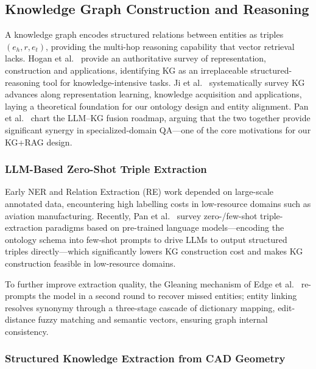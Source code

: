 \documentclass[applsci,article,submit,pdftex,moreauthors]{Definitions/mdpi}
\begin{document}
\subsection{Knowledge Graph Construction and Reasoning}
\label{sec:related-kg}

A knowledge graph encodes structured relations between entities as triples $(e_h, r, e_t)$, providing the multi-hop reasoning capability that vector retrieval lacks. Hogan et al.~\citep{hogan2021kg} provide an authoritative survey of representation, construction and applications, identifying KG as an irreplaceable structured-reasoning tool for knowledge-intensive tasks. Ji et al.~\citep{ji2022kgsurvey} systematically survey KG advances along representation learning, knowledge acquisition and applications, laying a theoretical foundation for our ontology design and entity alignment. Pan et al.~\citep{pan2024kgllmsurvey} chart the LLM--KG fusion roadmap, arguing that the two together provide significant synergy in specialized-domain QA---one of the core motivations for our KG+RAG design.

\subsubsection{LLM-Based Zero-Shot Triple Extraction}

Early NER and Relation Extraction (RE) work depended on large-scale annotated data, encountering high labelling costs in low-resource domains such as aviation manufacturing. Recently, Pan et al.~\citep{pan2024kgllmsurvey} survey zero-/few-shot triple-extraction paradigms based on pre-trained language models---encoding the ontology schema into few-shot prompts to drive LLMs to output structured triples directly---which significantly lowers KG construction cost and makes KG construction feasible in low-resource domains.

To further improve extraction quality, the Gleaning mechanism of Edge et al.~\citep{edge2024graphrag} re-prompts the model in a second round to recover missed entities; entity linking~\citep{wu2020corefresolution} resolves synonymy through a three-stage cascade of dictionary mapping, edit-distance fuzzy matching and semantic vectors, ensuring graph internal consistency.

\subsubsection{Structured Knowledge Extraction from CAD Geometry}
\end{document}
